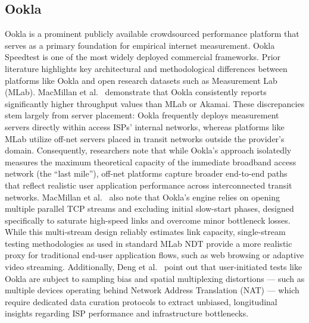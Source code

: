 \documentclass[sigconf,anonymous,review]{acmart}
\begin{document}
\subsection{Ookla}
Ookla is a prominent publicly available crowdsourced performance platform
that serves as a primary foundation for empirical internet measurement.
Ookla Speedtest is one of the most widely deployed commercial frameworks.
Prior literature highlights key architectural and methodological
differences between platforms like Ookla and open research datasets such as
Measurement Lab (MLab). MacMillan et al.~\cite{MacMillan2023} demonstrate that Ookla
consistently reports significantly higher throughput values than MLab or
Akamai. These discrepancies stem largely from server placement: Ookla
frequently deploys measurement servers directly within access ISPs'
internal networks, whereas platforms like MLab utilize off-net servers
placed in transit networks outside the provider's domain. Consequently,
researchers note that while Ookla's approach isolatedly measures the
maximum theoretical capacity of the immediate broadband access network (the
``last mile''), off-net platforms capture broader end-to-end paths that
reflect realistic user application performance across interconnected
transit networks. MacMillan et al.~\cite{MacMillan2023} also note that Ookla's engine
relies on opening multiple parallel TCP streams and excluding initial
slow-start phases, designed specifically to saturate high-speed links and
overcome minor bottleneck losses. While this multi-stream design reliably
estimates link capacity, single-stream testing methodologies as used in
standard MLab NDT provide a more realistic proxy for traditional end-user
application flows, such as web browsing or adaptive video streaming.
Additionally, Deng et al.~\cite{Deng2021} point out that user-initiated
tests like Ookla are subject to sampling bias and spatial multiplexing
distortions --- such as multiple devices operating behind Network Address
Translation (NAT) --- which require dedicated data curation protocols to
extract unbiased, longitudinal insights regarding ISP performance and
infrastructure bottlenecks.
\end{document}
